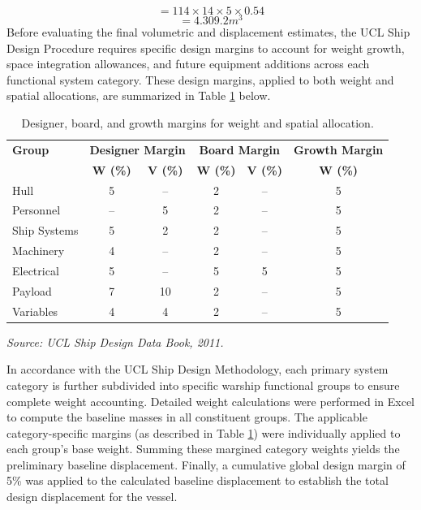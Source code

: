 \documentclass[12pt,a4paper,twoside]{report}
\begin{document}
$$= 114 \times14\times5\times0.54$$
$$=4.309.2m^{3}$$
 Before evaluating the final volumetric and displacement estimates, the UCL Ship Design Procedure requires specific design margins to account for weight growth, space integration allowances, and future equipment additions across each functional system category. These design margins, applied to both weight and spatial allocations, are summarized in Table \ref{tab:design_margins} below.
\begin{table}[htbp]
    \centering
    \caption{Designer, board, and growth margins for weight and spatial allocation.}
    \label{tab:design_margins}

    \begin{tabular}{lccccc}
        \toprule
        \textbf{Group} &
        \multicolumn{2}{c}{\textbf{Designer Margin}} &
        \multicolumn{2}{c}{\textbf{Board Margin}} &
        \multicolumn{1}{c}{\textbf{Growth Margin}} \\
        
        & \textbf{W (\%)} & \textbf{V (\%)} &
        \textbf{W (\%)} & \textbf{V (\%)} &
        \textbf{W (\%)} \\
        \midrule
        
        Hull        & 5 & -- & 2 & -- & 5 \\
        Personnel   & -- & 5 & 2 & -- & 5 \\
        Ship Systems & 5 & 2 & 2 & -- & 5 \\
        Machinery   & 4 & -- & 2 & -- & 5 \\
        Electrical  & 5 & -- & 5 & 5 & 5 \\
        Payload     & 7 & 10 & 2 & -- & 5 \\
        Variables   & 4 & 4 & 2 & -- & 5 \\
        
        \bottomrule
    \end{tabular}

    \vspace{2mm}
    
    \footnotesize
    \textit{Source: UCL Ship Design Data Book, 2011. \cite{ucl_ship_design_data_book}}
    
\end{table}
In accordance with the UCL Ship Design Methodology, each primary system category is further subdivided into specific warship functional groups to ensure complete weight accounting. Detailed weight calculations were performed in Excel to compute the baseline masses in all constituent groups. The applicable category-specific margins (as described in Table \ref{tab:design_margins}) were individually applied to each group's base weight. Summing these margined category weights yields the preliminary baseline displacement. Finally, a cumulative global design margin of 5\% was applied to the calculated baseline displacement to establish the total design displacement for the vessel.
\end{document}
